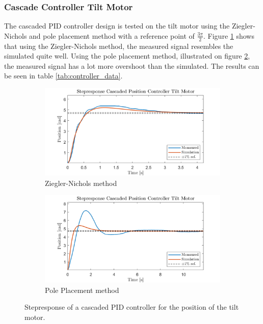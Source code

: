 \documentclass[../../main.tex]{subfiles}
\begin{document}
\subsubsection*{Cascade Controller Tilt Motor}
The cascaded PID controller design is tested on the tilt motor using the Ziegler-Nichols and pole placement method with a reference point of $\frac{3\pi}{2}$. Figure \ref{fig:Cascade_ZN_tilt} shows that using the Ziegler-Nichols method, the measured signal resembles the simulated quite well. Using the pole placement method, illustrated on figure \ref{fig:cascade_model_tilt}, the measured signal has a lot more overshoot than the simulated. The results can be seen in table \ref{tab:controller_data}.

\begin{figure}[h]
     \centering
     \begin{subfigure}[b]{0.49\textwidth}
         \centering
         \includegraphics[width=\textwidth]{Sections/Test/Images/cascade_ZN_tilt.png}
         \caption{Ziegler-Nichols method}
         \label{fig:Cascade_ZN_tilt}
     \end{subfigure}
     \hfill
     \begin{subfigure}[b]{0.49\textwidth}
         \centering
         \includegraphics[width=\textwidth]{Sections/Test/Images/cascade_Model_tilt.png}
         \caption{Pole Placement method}
         \label{fig:cascade_model_tilt}
     \end{subfigure}
        \caption{Stepresponse of a cascaded PID controller for the position of the tilt motor.}
        \label{fig:CascadeTilt}
\end{figure}
\end{document}
